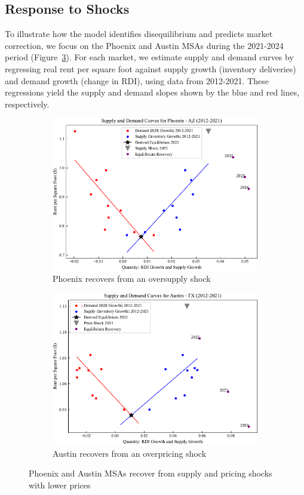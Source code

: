 \documentclass[APA,Times1COL]{WileyNJDv5} %
\begin{document}
\subsection{Response to Shocks}
To illustrate how the model identifies disequilibrium and predicts market correction, we focus on the Phoenix and Austin MSAs during the 2021-2024 period (Figure~\ref{fig:response_shocks}). For each market, we estimate supply and demand curves by regressing real rent per square foot against supply growth (inventory deliveries) and demand growth (change in RDI), using data from 2012-2021. These regressions yield the supply and demand slopes shown by the blue and red lines, respectively.
\begin{figure}[hbt!]
	\centering
	\begin{subfigure}[b]{0.49\textwidth}
		\includegraphics[width=\linewidth]{phoenix_example.pdf}
		\caption{Phoenix recovers from an oversupply shock}\label{fig:us_phoenix_mechanism}
	\end{subfigure}\hfill
	\begin{subfigure}[b]{0.49\textwidth}
		\includegraphics[width=\linewidth]{austin_example.pdf}
		\caption{Austin recovers from an overpricing shock}\label{fig:austin_example}
	\end{subfigure}\hfill
	\caption{Phoenix and Austin MSAs recover from supply and pricing shocks with lower prices}
	\label{fig:response_shocks}
\end{figure}
\end{document}
